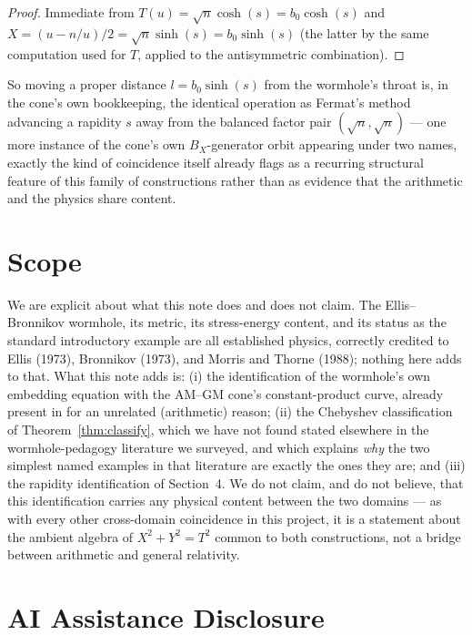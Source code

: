 \documentclass[12pt]{amsart}
\theoremstyle{plain}
\theoremstyle{remark}
\begin{document}
\begin{proof}
Immediate from $T(u)=\sqrt n\cosh(s)=b_0\cosh(s)$ and $X=(u-n/u)/2=\sqrt n\sinh(s)=b_0\sinh(s)$ (the latter by the same computation used for $T$, applied to the antisymmetric combination).
\end{proof}

So moving a proper distance $l=b_0\sinh(s)$ from the wormhole's throat is, in the cone's own bookkeeping, the identical operation as Fermat's method advancing a rapidity $s$ away from the balanced factor pair $(\sqrt n,\sqrt n)$ --- one more instance of the cone's own $B_X$-generator orbit appearing under two names, exactly the kind of coincidence \cite{Ebert2026EigenCoord} itself already flags as a recurring structural feature of this family of constructions rather than as evidence that the arithmetic and the physics share content.

\section{Scope}

We are explicit about what this note does and does not claim. The Ellis--Bronnikov wormhole, its metric, its stress-energy content, and its status as the standard introductory example are all established physics, correctly credited to Ellis (1973), Bronnikov (1973), and Morris and Thorne (1988); nothing here adds to that. What this note adds is: (i) the identification of the wormhole's own embedding equation with the AM--GM cone's constant-product curve, already present in \cite{Ebert2026Table} for an unrelated (arithmetic) reason; (ii) the Chebyshev classification of Theorem~\ref{thm:classify}, which we have not found stated elsewhere in the wormhole-pedagogy literature we surveyed, and which explains \emph{why} the two simplest named examples in that literature are exactly the ones they are; and (iii) the rapidity identification of Section~4. We do not claim, and do not believe, that this identification carries any physical content between the two domains --- as with every other cross-domain coincidence in this project, it is a statement about the ambient algebra of $X^2+Y^2=T^2$ common to both constructions, not a bridge between arithmetic and general relativity.

\section*{AI Assistance Disclosure}
\end{document}
